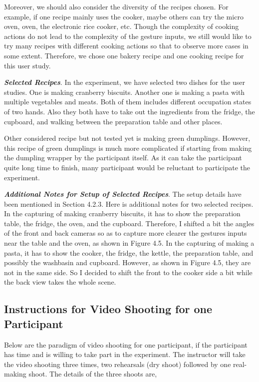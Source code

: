 \documentclass[fyp]{socreport}
\begin{document}
Moreover, we should also consider the diversity of the recipes chosen. For example, if one recipe mainly uses the cooker, maybe others can try the micro oven, oven, the electronic rice cooker, etc. Though the complexity of cooking actions do not lead to the complexity of the gesture inputs, we still would like to try many recipes with different cooking actions so that to observe more cases in some extent. Therefore, we chose one bakery recipe and one cooking recipe for this user study.

\textbf{\textit{Selected Recipes}}. In the experiment, we have selected two dishes for the user studies. One is making cranberry biscuits. Another one is making a pasta with multiple vegetables and meats. Both of them includes different occupation states of two hands. Also they both have to take out the ingredients from the fridge, the cupboard, and walking between the preparation table and other places.

Other considered recipe but not tested yet is making green dumplings. However, this recipe of green dumplings is much more complicated if starting from making the dumpling wrapper by the participant itself. As it can take the participant quite long time to finish, many participant would be reluctant to participate the experiment.

\textbf{\textit{Additional Notes for Setup of Selected Recipes}}. The setup details have been mentioned in Section 4.2.3. Here is additional notes for two selected recipes. In the capturing of making cranberry biscuits, it has to show the preparation table, the fridge, the oven, and the cupboard. Therefore, I shifted a bit the angles of the front and back cameras so as to capture more clearer the gestures inputs near the table and the oven, as shown in Figure 4.5. In the capturing of making a pasta, it has to show the cooker, the fridge, the kettle, the preparation table, and possibly the washbasin and cupboard. However, as shown in Figure 4.5, they are not in the same side. So I decided to shift the front to the cooker side a bit while the back view takes the whole scene.

\subsection{Instructions for Video Shooting for one Participant}

Below are the paradigm of video shooting for one participant, if the participant has time and is willing to take part in the experiment. The instructor will take the video shooting three times, two rehearsals (dry shoot) followed by one real-making shoot. The details of the three shoots are,
\end{document}
